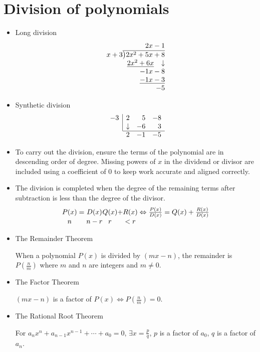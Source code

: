 \section{Division of polynomials}
\begin{itemize}
    \item Long division
        \[
            \begin{array}{r}
                2x-1 \\
                x+3\overline{\smash{\big)}2x^2+5x+8} \\
                \underline{2x^2+6x}\mathbin{\phantom{+}}\downarrow \\
                -1x-8 \\
                \underline{-1x-3} \\
                -5
            \end{array}
        \]
    \item Synthetic division
        \[
            \begin{array}{rrrr}
                \multicolumn{1}{r|}{-3} & 2 & 5 & -8 \\
                \multicolumn{1}{r|}{} & \downarrow & -6 & 3 \\ \cline{2-4}
                & 2 & -1 & -5
            \end{array}
        \]
    \item To carry out the division, ensure the terms of the polynomial are in descending order of degree. Missing powers of $x$ in the dividend or divisor are included using a coefficient of 0 to keep work accurate and aligned correctly.
    \item The division is completed when the degree of the remaining terms after subtraction is less than the degree of the divisor.
        \[
            \begin{array}{c@{}c@{}c@{}c@{}c@{}c@{}c}
            P(x) & {}={} & D(x) & Q(x) & + & R(x) & {}\Leftrightarrow \frac{P(x)}{D(x)}=Q(x)+\frac{R(x)}{D(x)} \\
            n & & n-r & r & & <r &
            \end{array}
        \]
    \item The Remainder Theorem

        When a polynomial $P(x)$ is divided by $(mx-n)$, the remainder is $P(\frac{n}{m})$ where $m$ and $n$ are integers and $m\neq 0$.
    \item The Factor Theorem
        
        $(mx-n)$ is a factor of $P(x)\iff P(\frac{n}{m})=0$.
    \item The Rational Root Theorem

        For $a_nx^n+a_{n-1}x^{n-1}+\cdots+a_0=0$, $\exists x=\frac{p}{q}$, $p$ is a factor of $a_0$, $q$ is a factor of $a_n$.
\end{itemize}

